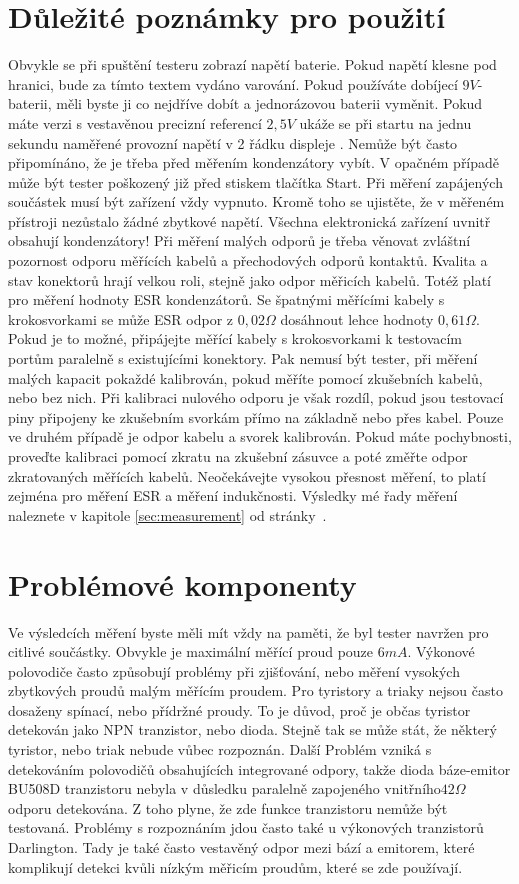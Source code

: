 \section{Důležité poznámky pro použití}
Obvykle se při spuštění testeru zobrazí napětí baterie. Pokud napětí klesne pod hranici,
bude za tímto textem vydáno varování.
Pokud používáte dobíjecí \(9V\)-baterii, měli byste ji co nejdříve dobít a jednorázovou baterii vyměnit.
Pokud máte verzi s vestavěnou precizní referencí \(2,5V\) ukáže se při startu na jednu sekundu
naměřené provozní napětí v 2 řádku displeje .
Nemůže být často připomínáno, že je třeba před měřením kondenzátory vybít.
V opačném případě může být tester poškozený již před stiskem tlačítka Start.
Při měření zapájených součástek musí být zařízení vždy vypnuto.
Kromě toho se ujistěte, že v měřeném přístroji nezůstalo žádné zbytkové napětí.
Všechna elektronická zařízení uvnitř obsahují kondenzátory!
Při měření malých odporů je třeba věnovat zvláštní pozornost odporu měřících kabelů a přechodových
odporů kontaktů.
Kvalita a stav konektorů hrají velkou roli, stejně jako odpor měřicích kabelů.
Totéž platí pro měření hodnoty ESR kondenzátorů.
Se špatnými měřícími kabely s krokosvorkami se může ESR odpor z \(0,02\Omega\) dosáhnout
lehce hodnoty \(0,61\Omega\).
Pokud je to možné, připájejte měřící kabely s krokosvorkami k testovacím portům
paralelně s existujícími konektory.
Pak nemusí být tester, při měření malých kapacit pokaždé kalibrován,
pokud měříte pomocí zkušebních kabelů, nebo bez nich.
Při kalibraci nulového odporu je však rozdíl, pokud jsou testovací piny připojeny ke zkušebním
svorkám přímo na základně nebo přes kabel.
Pouze ve druhém případě je odpor kabelu a svorek kalibrován.
Pokud máte pochybnosti, proveďte kalibraci pomocí zkratu na zkušební zásuvce a poté
změřte odpor zkratovaných měřících kabelů.
Neočekávejte vysokou přesnost měření, to platí zejména pro měření ESR a měření indukčnosti.
Výsledky mé řady měření naleznete v kapitole \ref{sec:measurement} od stránky~\pageref{sec:measurement}.



\section{Problémové komponenty}
Ve výsledcích měření byste měli mít vždy na paměti, že byl tester navržen pro citlivé součástky.
Obvykle je maximální měřící proud pouze \(6mA\).
Výkonové polovodiče často způsobují problémy při zjišťování,
nebo měření vysokých zbytkových proudů malým měřícím proudem.
Pro tyristory a triaky nejsou často dosaženy spínací, nebo přídržné proudy.
To je důvod, proč je občas tyristor detekován jako NPN tranzistor, nebo dioda.
Stejně tak se může stát, že některý tyristor, nebo triak nebude vůbec rozpoznán.
Další Problém vzniká s detekováním polovodičů obsahujících integrované odpory,
takže dioda báze-emitor BU508D tranzistoru nebyla v důsledku paralelně zapojeného
vnitřního\(42 \Omega\) odporu detekována.
Z toho plyne, že zde funkce tranzistoru nemůže být testovaná.
Problémy s rozpoznáním jdou často také u výkonových tranzistorů Darlington.
Tady je také často vestavěný odpor mezi bází a emitorem,
které komplikují detekci kvůli nízkým měřicím proudům, které se zde používají.

